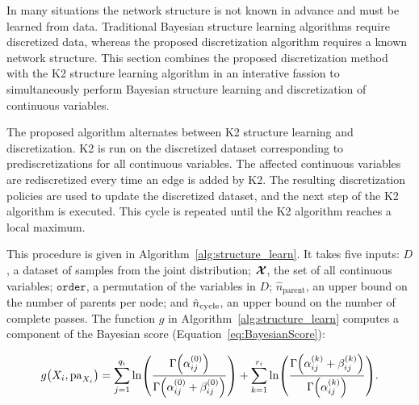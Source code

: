 In many situations the network structure is not known in advance and must be learned from data.
Traditional Bayesian structure learning algorithms require discretized data, whereas the proposed discretization algorithm requires a known network structure.
This section combines the proposed discretization method with the K2 structure learning algorithm \citep{K2} in an interative fassion to simultaneously perform Bayesian structure learning and discretization of continuous variables.

The proposed algorithm alternates between K2 structure learning and discretization.
K2 is run on the discretized dataset corresponding to prediscretizations for all continuous variables.
The affected continuous variables are rediscretized every time an edge is added by K2.
The resulting discretization policies are used to update the discretized dataset, and the next step of the K2 algorithm is executed.
This cycle is repeated until the K2 algorithm reaches a local maximum.

This procedure is given in Algorithm~\ref{alg:structure_learn}.
It takes five inputs: $D$, a dataset of samples from the joint distribution; $\bm{\mathcal{X}}$, the set of all continuous variables; $\texttt{order}$, a permutation of the variables in $D$; $\hat{n}_\text{parent}$, an upper bound on the number of parents per node; and $\hat{n}_\text{cycle}$, an upper bound on the number of complete passes.
The function $g$ in Algorithm~\ref{alg:structure_learn} computes a component of the Bayesian score (Equation~\ref{eq:BayesianScore}):

\begin{equation}
  \label{eq:B_Score_one}
  g\paren{X_i, \Pa_{X_i}} =  \sum_{j=1}^{q_i} \ln\paren{
    \frac{
      \Gamma\paren{\alpha_{ij}^{(0)}}
    }{
      \Gamma\paren{\alpha_{ij}^{(0)} + \beta_{ij}^{(0)}}
    }
  } + \sum_{k=1}^{r_i} \ln \paren{
    \frac{
      \Gamma\paren{\alpha_{ij}^{(k)} + \beta_{ij}^{(k)}}
    }{
      \Gamma\paren{\alpha_{ij}^{(k)}}
    }
  }\text{.}
\end{equation}

